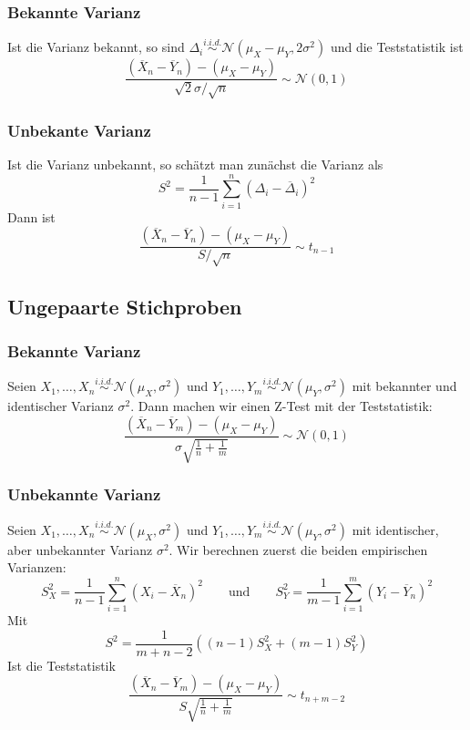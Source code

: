 \documentclass[a4paper,titlepage]{article}
\begin{document}
\subsubsection{Bekannte Varianz}
Ist die Varianz bekannt, so sind $\Delta_i \overset{i.i.d.}{\sim} \mathcal{N}(\mu_X - \mu_Y, 2 \sigma^2)$ und die Teststatistik ist
\begin{equation*}
\frac{(\overline{X}_n - \overline{Y}_n) - (\mu_X - \mu_Y)}{\sqrt{2}\sigma / \sqrt{n}} \sim \mathcal{N}(0,1)
\end{equation*}

\subsubsection{Unbekante Varianz}
Ist die Varianz unbekannt, so schätzt man zunächst die Varianz als
\begin{equation*}
S^2 = \frac{1}{n-1} \sum_{i=1}^{n} \left( \Delta_i - \overline{\Delta}_i \right)^2
\end{equation*}
Dann ist 
\begin{equation*}
\frac{(\overline{X}_n - \overline{Y}_n) - (\mu_X - \mu_Y)}{ S / \sqrt{n}} \sim t_{n-1}
\end{equation*}

\subsection{Ungepaarte Stichproben}
\subsubsection{Bekannte Varianz}
Seien $X_1, \dots, X_n \overset{i.i.d.}{\sim} \mathcal{N}(\mu_X, \sigma^2)$ und $Y_1, \dots, Y_m \overset{i.i.d.}{\sim} \mathcal{N}(\mu_Y, \sigma^2)$ mit bekannter und identischer Varianz $\sigma^2$. Dann machen wir einen Z-Test mit der Teststatistik:
\begin{equation*}
\frac{(\overline{X}_n- \overline{Y}_m) - (\mu_X - \mu_Y)}{\sigma \sqrt{\frac{1}{n} + \frac{1}{m}}} \sim \mathcal{N}(0,1)
\end{equation*}
\subsubsection{Unbekannte Varianz}
Seien $X_1, \dots, X_n \overset{i.i.d.}{\sim} \mathcal{N}(\mu_X, \sigma^2)$ und $Y_1, \dots, Y_m \overset{i.i.d.}{\sim} \mathcal{N}(\mu_Y, \sigma^2)$ mit identischer, aber unbekannter Varianz $\sigma^2$. Wir berechnen zuerst die beiden empirischen Varianzen:
\begin{equation*}
S_X^2 = \frac{1}{n-1}\sum_{i=1}^{n}(X_i - \overline{X}_n)^2 \qquad\text{und}\qquad S_Y^2 = \frac{1}{m-1}\sum_{i=1}^{m}(Y_i - \overline{Y}_n)^2
\end{equation*}
Mit 
\begin{equation*}
S^2 = \frac{1}{m+n-2}\left( \left( n - 1 \right) S_X^2 + \left( m - 1 \right) S_Y^2 \right)
\end{equation*}
Ist die Teststatistik
\begin{equation*}
\frac{(\overline{X}_n- \overline{Y}_m) - (\mu_X - \mu_Y)}{S \sqrt{\frac{1}{n} + \frac{1}{m}}} \sim t_{n+m-2}
\end{equation*}
\end{document}

